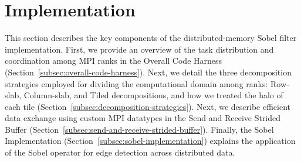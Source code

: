 \section{Implementation}
\label{sec:implementation}

This section describes the key components of the distributed-memory Sobel filter implementation. First, we provide an overview of the task distribution and coordination among MPI ranks in the Overall Code Harness (Section~\ref{subsec:overall-code-harness}). Next, we detail the three decomposition strategies employed for dividing the computational domain among ranks: Row-slab, Column-slab, and Tiled decompositions, and how we treated the halo of each tile (Section~\ref{subsec:decomposition-strategies}). Next, we describe efficient data exchange using custom MPI datatypes in the Send and Receive Strided Buffer (Section~\ref{subsec:send-and-receive-strided-buffer}). Finally, the Sobel Implementation (Section~\ref{subsec:sobel-implementation}) explains the application of the Sobel operator for edge detection across distributed data. 